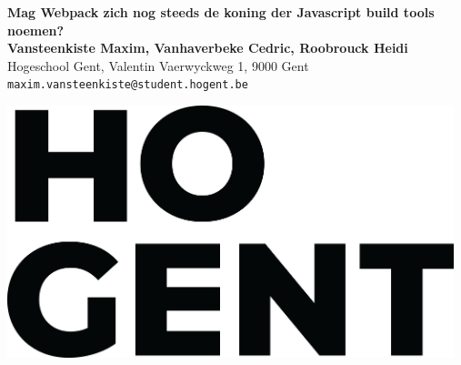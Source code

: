 \documentclass[a0,portrait]{a0poster}
\begin{document}


\begin{minipage}[t]{0.75\linewidth}
\VeryHuge \color{HoGentAccent1} \textbf{Mag Webpack zich nog steeds de koning der Javascript build tools noemen?} \color{Black}\\ %
\huge \textbf{Vansteenkiste Maxim, Vanhaverbeke Cedric, Roobrouck Heidi}\\[0.5cm] %
\huge Hogeschool Gent, Valentin Vaerwyckweg 1, 9000 Gent\\[0.4cm] %
\Large \texttt{maxim.vansteenkiste@student.hogent.be} \\
\end{minipage}
%
\begin{minipage}[t]{0.25\linewidth}
\includegraphics[width=13cm,right]{figures/HOGENT_Logo_Pos_rgb.png} 

\end{minipage}

\vspace{1cm} %

\end{document}
